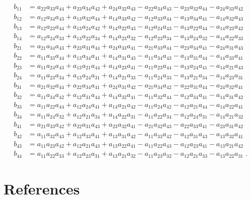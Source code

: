 \documentclass[preprint,12pt]{elsarticle}
\begin{document}
\begin{align}
    b_{11} &= a_{22}a_{33}a_{44}+a_{23}a_{34}a_{42}+a_{24}a_{32}a_{43}-a_{22}a_{34}a_{43}-a_{23}a_{32}a_{44}-a_{24}a_{33}a_{42} \nonumber\\
    b_{12} &= a_{12}a_{34}a_{43}+a_{13}a_{32}a_{44}+a_{14}a_{33}a_{42}-a_{12}a_{33}a_{44}-a_{13}a_{34}a_{41}-a_{14}a_{32}a_{43} \nonumber\\
    b_{13} &= a_{12}a_{23}a_{44}+a_{13}a_{24}a_{42}+a_{14}a_{22}a_{43}-a_{12}a_{24}a_{43}-a_{13}a_{22}a_{44}-a_{14}a_{23}a_{42} \nonumber\\
    b_{14} &= a_{12}a_{24}a_{33}+a_{13}a_{22}a_{34}+a_{14}a_{23}a_{32}-a_{12}a_{23}a_{34}-a_{13}a_{24}a_{32}-a_{14}a_{22}a_{33} \nonumber\\[1ex]
    b_{21} &= a_{21}a_{34}a_{43}+a_{23}a_{31}a_{44}+a_{24}a_{33}a_{41}-a_{21}a_{33}a_{44}-a_{23}a_{34}a_{41}-a_{24}a_{31}a_{43} \nonumber\\
    b_{22} &= a_{11}a_{33}a_{44}+a_{13}a_{34}a_{41}+a_{14}a_{31}a_{43}-a_{11}a_{34}a_{43}-a_{13}a_{31}a_{44}-a_{14}a_{33}a_{41} \nonumber\\
    b_{23} &= a_{11}a_{24}a_{43}+a_{13}a_{21}a_{44}+a_{14}a_{23}a_{41}-a_{11}a_{23}a_{44}-a_{13}a_{24}a_{41}-a_{14}a_{21}a_{43} \nonumber\\
    b_{24} &= a_{11}a_{23}a_{34}+a_{13}a_{24}a_{31}+a_{14}a_{21}a_{33}-a_{11}a_{24}a_{33}-a_{13}a_{21}a_{34}-a_{14}a_{23}a_{31} \nonumber\\[1ex]
    b_{31} &= a_{21}a_{32}a_{44}+a_{22}a_{34}a_{41}+a_{24}a_{31}a_{42}-a_{21}a_{34}a_{42}-a_{22}a_{31}a_{44}-a_{24}a_{32}a_{41} \nonumber\\
    b_{32} &= a_{11}a_{34}a_{42}+a_{12}a_{31}a_{44}+a_{14}a_{32}a_{41}-a_{11}a_{32}a_{44}-a_{12}a_{34}a_{41}-a_{14}a_{31}a_{42} \nonumber\\
    b_{33} &= a_{11}a_{22}a_{44}+a_{12}a_{24}a_{41}+a_{14}a_{21}a_{42}-a_{11}a_{24}a_{42}-a_{12}a_{21}a_{44}-a_{14}a_{22}a_{41} \nonumber\\
    b_{34} &= a_{11}a_{24}a_{32}+a_{12}a_{21}a_{34}+a_{14}a_{22}a_{31}-a_{11}a_{22}a_{34}-a_{12}a_{24}a_{31}-a_{14}a_{21}a_{32} \nonumber\\[1ex]
    b_{41} &= a_{21}a_{33}a_{42}+a_{22}a_{31}a_{43}+a_{23}a_{32}a_{41}-a_{21}a_{32}a_{43}-a_{22}a_{33}a_{41}-a_{23}a_{31}a_{42} \nonumber\\
    b_{42} &= a_{11}a_{32}a_{43}+a_{12}a_{33}a_{41}+a_{13}a_{31}a_{42}-a_{11}a_{33}a_{42}-a_{12}a_{31}a_{43}-a_{13}a_{32}a_{41} \nonumber\\
    b_{43} &= a_{11}a_{23}a_{42}+a_{12}a_{21}a_{43}+a_{13}a_{22}a_{41}-a_{11}a_{22}a_{43}-a_{12}a_{23}a_{41}-a_{13}a_{21}a_{42} \nonumber\\
    b_{44} &= a_{11}a_{22}a_{33}+a_{12}a_{23}a_{31}+a_{13}a_{21}a_{32}-a_{11}a_{23}a_{32}-a_{12}a_{21}a_{33}-a_{13}a_{22}a_{31} \nonumber \;.
\end{align}

\section*{References}


\end{document}

